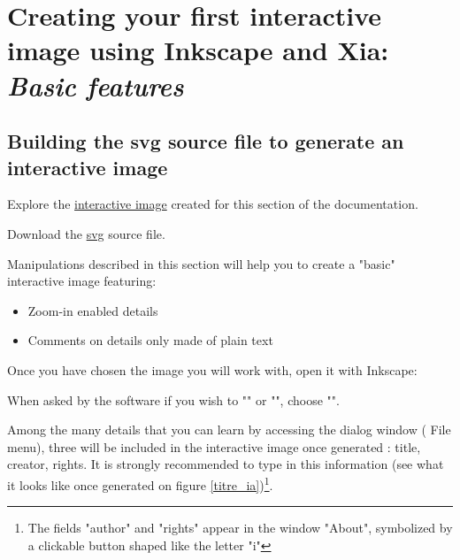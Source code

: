 \section{Creating your first interactive image using Inkscape and Xia: \emph{Basic features}}\label{basic_imageactive}

\subsection{Building the svg source file to generate an interactive image}\label{preparation_svg}

\begin{links}
Explore the \href{http://xia.dane.ac-versailles.fr/demo/tuto/xia1}{interactive image} created for this section of the documentation.

Download the \href{http://xia.dane.ac-versailles.fr/demo/tuto/xia1/svg/xia1.svg}{svg} source file.
\end{links}

Manipulations described in this section will help you to
create a "basic" interactive image featuring:
\begin{itemize}
 \item Zoom-in enabled details
 \item Comments on details only made of plain text
\end{itemize}


Once you have chosen the image you will work with, open it with Inkscape:


When asked by the software if you wish to "" or "", choose "".

Among the many details that you can learn by accessing the 
dialog window  (\chemin
{File} menu), three will be included in the interactive image once
generated : title, creator, rights. It is strongly recommended to type in this information
(see what it looks like once generated on figure \ref{titre_ia})\footnote{The
fields "author" and "rights" appear in the window
"About", symbolized by a clickable button shaped like the letter "i"}.

